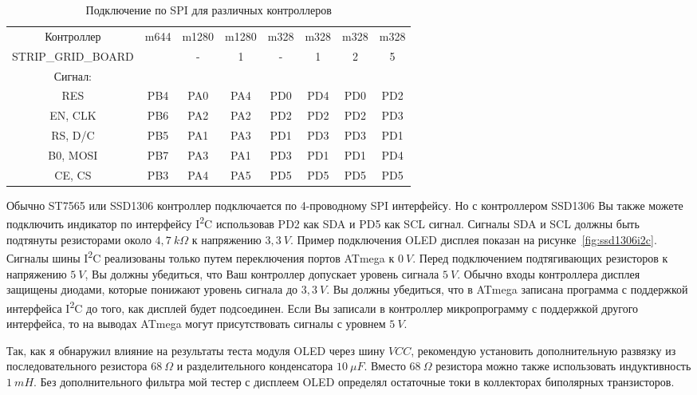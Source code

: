 \begin{table}[H]
  \begin{center}
    \begin{tabular}{| c || c | c | c | c | c | c | c |}
    \hline
 Контроллер  & m644  & m1280 & m1280  & m328 & m328 & m328 & m328 \\
STRIP\_GRID\_BOARD &       &   -   &   1    &  -   &  1   &  2   &  5   \\
Сигнал:     &       &       &        &      &      &      &     \\
    \hline
    \hline
  RES       &  PB4  & PA0   &  PA4   & PD0  & PD4  & PD0  & PD2 \\
    \hline
  EN, CLK   &  PB6  & PA2   &  PA2   & PD2  & PD2  & PD2  & PD3 \\
    \hline
  RS, D/C   &  PB5  & PA1   &  PA3   & PD1  & PD3  & PD3  & PD1 \\
    \hline
  B0, MOSI  &  PB7  & PA3   &  PA1   & PD3  & PD1  & PD1  & PD4 \\
    \hline
  CE, CS    &  PB3  & PA4   &  PA5   & PD5  & PD5  & PD5  & PD5 \\
    \hline
    \end{tabular}
  \end{center}
  \caption{Подключение по SPI для различных контроллеров}
  \label{tab:spi-processor}
\end{table}

Обычно ST7565 или SSD1306 контроллер подключается по 4-проводному SPI интерфейсу.
Но с контроллером SSD1306 Вы также можете подключить индикатор по интерфейсу I\textsuperscript{2}C использовав PD2 
как SDA и PD5 как SCL сигнал.
Сигналы SDA и SCL должны быть подтянуты резисторами около \(4,7~k\Omega\) к напряжению \(3,3~V\).
Пример подключения OLED дисплея показан на рисунке~\ref{fig:ssd1306i2c}.
Сигналы шины I\textsuperscript{2}C реализованы только путем переключения портов ATmega к \(0~V\).
Перед подключением подтягивающих резисторов к напряжению \(5~V\), Вы должны убедиться, что Ваш контроллер
допускает уровень сигнала \(5~V\). Обычно входы контроллера дисплея защищены диодами, которые понижают уровень 
сигнала до \(3,3~V\). 
Вы должны убедиться, что в ATmega записана программа с поддержкой интерфейса I\textsuperscript{2}C до того,
как дисплей будет подсоединен. Если Вы записали в контроллер микропрограмму с поддержкой другого интерфейса,
то на выводах ATmega могут присутствовать сигналы с уровнем \(5~V\).

Так, как я обнаружил влияние на результаты теста модуля OLED через шину \(VCC\), рекомендую
установить дополнительную развязку из последовательного резистора \(68~\Omega\) и разделительного конденсатора \(10~\mu F\). 
Вместо \(68~\Omega\) резистора можно также использовать индуктивность \(1~mH\).
Без дополнительного фильтра мой тестер с дисплеем OLED определял остаточные токи в коллекторах биполярных транзисторов.

